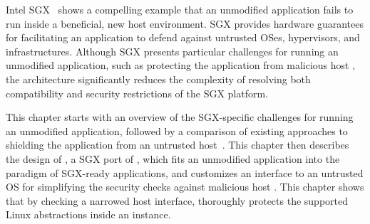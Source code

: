 Intel SGX~\cite{intelsgx} shows a compelling example that an unmodified application fails to run inside a beneficial, new host environment.
SGX provides hardware guarantees
for facilitating an application to defend against untrusted OSes, hypervisors, and infrastructures.
Although SGX presents particular challenges for running an unmodified application, such as protecting the application
from malicious host \linuxapis{},
the \graphene{} architecture significantly reduces the complexity
of resolving both compatibility and security restrictions of the SGX platform.


This chapter starts with an overview of the SGX-specific challenges
for running an unmodified application,
followed by a comparison of existing approaches to shielding the application from an untrusted host~\cite{osdi16scone,shinde17panoply,baumann14haven}.
This chapter then describes the design of \graphenesgx{},
a SGX port of \graphene{},
which fits an unmodified application into the paradigm of SGX-ready applications,
and customizes an interface to an untrusted OS
for simplifying the security checks against malicious host \linuxapis{}.
This chapter shows
that by checking a narrowed host interface,
\graphene{} thoroughly protects the supported Linux abstractions inside an \thelibos{} instance.
